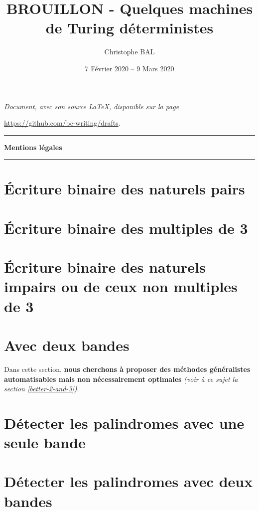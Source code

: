\documentclass[a4paper, 12pt]{scrartcl}
\begin{document}
\title{BROUILLON - Quelques machines de Turing déterministes}
\author{Christophe BAL}
\date{7 Février 2020 -- 9 Mars 2020}

\maketitle

\begin{center}
	\itshape
	Document, avec son source \LaTeX, disponible sur la page
	
	\url{https://github.com/bc-writing/drafts}.
\end{center}


\bigskip


\begin{center}
	\hrule\vspace{.3em}
	{
		\fontsize{1.35em}{1em}\selectfont
		\textbf{Mentions \og légales \fg}
	}
			
	\vspace{0.45em}
	\doclicenseThis
	\hrule
\end{center}


\bigskip
\setcounter{tocdepth}{2}
\tableofcontents



\newpage
\section{Écriture binaire des naturels pairs}

	


\newpage
\section{Écriture binaire des multiples de 3} \label{divisibility-by-3}

	


\newpage
\section{Écriture binaire des naturels impairs ou de ceux non multiples de 3}

	


\newpage
\section{Avec deux bandes}

	Dans cette section, \textbf{nous cherchons à proposer des méthodes généralistes automatisables mais non nécessairement optimales}
	\emph{(voir à ce sujet la section \ref{better-2-and-3})}.

	


\newpage
\section{Détecter les palindromes avec une seule bande}

	



\newpage
\section{Détecter les palindromes avec deux bandes}

	
\end{document}
